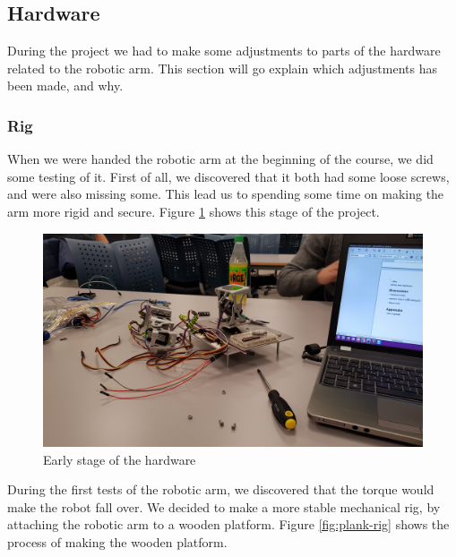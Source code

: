 \documentclass[11pt,a4paper, titlepage]{article}
\begin{document}
	\subsection{Hardware}
	During the project we had to make some adjustments to parts of the hardware related to the robotic arm. This section will go explain which adjustments has been made, and why.
	\subsubsection{Rig}
	When we were handed the robotic arm at the beginning of the course, we did some testing of it. First of all, we discovered that it both had some loose screws, and were also missing some. This lead us to spending some time on making the arm more rigid and secure. Figure \ref{fig:early-rig} shows this stage of the project.
	
	\begin{figure}[H]
		\centering
		\includegraphics[width=0.8\linewidth]{../Diagrams/early-setup.jpg}
		\caption{Early stage of the hardware}
		\label{fig:early-rig}
	\end{figure}
	
	During the first tests of the robotic arm, we discovered that the torque would make the robot fall over. We decided to make a more stable mechanical rig, by attaching the robotic arm to a wooden platform. Figure \ref{fig:plank-rig} shows the process of making the wooden platform.
\end{document}
